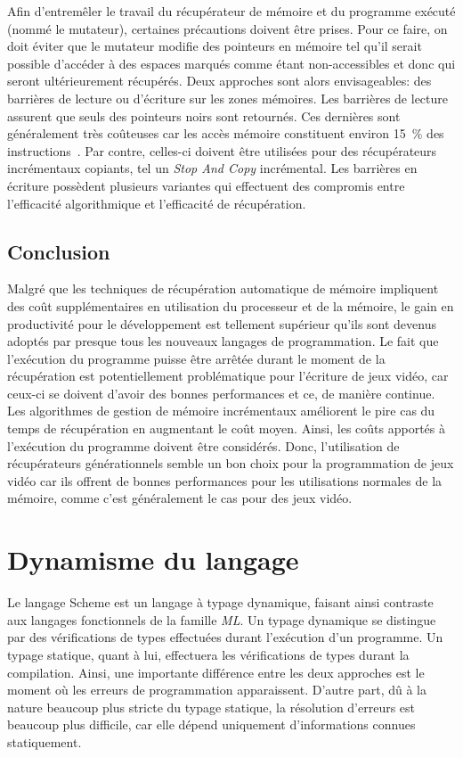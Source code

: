 \documentclass[12pt,twoside,letterpaper,francais]{book}
\begin{document}
Afin d'entremêler le travail du récupérateur de mémoire et du
programme exécuté (nommé le mutateur), certaines précautions doivent
être prises. Pour ce faire, on doit éviter que le mutateur modifie des
pointeurs en mémoire tel qu'il serait possible d'accéder à des espaces
marqués comme étant non-accessibles et donc qui seront ultérieurement
récupérés. Deux approches sont alors envisageables: des barrières de
lecture ou d'écriture sur les zones mémoires. Les barrières de lecture
assurent que seuls des pointeurs noirs sont retournés. Ces dernières
sont généralement très coûteuses car les accès mémoire constituent
environ 15~\% des instructions~\cite{Zorn90barriermethods}. Par
contre, celles-ci doivent être utilisées pour des récupérateurs
incrémentaux copiants, tel un \textit{Stop And Copy} incrémental. Les
barrières en écriture possèdent plusieurs variantes qui effectuent
des compromis entre l'efficacité algorithmique et l'efficacité de
récupération.


\FloatBarrier
\subsection{Conclusion}
Malgré que les techniques de récupération automatique de mémoire
impliquent des coût supplémentaires en utilisation du processeur et de
la mémoire, le gain en productivité pour le dévelop\-pement est
tellement supérieur qu'ils sont devenus adoptés par presque tous les
nouveaux langages de programmation. Le fait que l'exécution du
programme puisse être arrêtée durant le moment de la récupération est
potentiellement problématique pour l'écriture de jeux vidéo, car
ceux-ci se doivent d'avoir des bonnes performances et ce, de manière
continue. Les algorithmes de gestion de mémoire incrémentaux
améliorent le pire cas du temps de récupération en augmentant le coût
moyen. Ainsi, les coûts apportés à l'exécution du programme doivent
être considérés. Donc, l'utilisation de récupérateurs
gé\-né\-ra\-tion\-nels semble un bon choix pour la programmation de
jeux vidéo car ils offrent de bonnes performances pour les
utilisations normales de la mémoire, comme c'est généralement le cas
pour des jeux vidéo.


\FloatBarrier
\section{Dynamisme du langage}

Le langage Scheme est un langage à typage dynamique, faisant ainsi
contraste aux langages fonctionnels de la famille \textit{ML}. Un
typage dynamique se distingue par des vérifi\-cations de types
effectuées durant l'ex\-écution d'un programme. Un typage statique,
quant à lui, effectuera les vérifications de types durant la
compilation. Ainsi, une importante différence entre les deux approches
est le moment où les erreurs de programmation apparaissent. D'autre
part, dû à la nature beaucoup plus stricte du typage statique, la
résolution d'erreurs est beaucoup plus difficile, car elle dépend
uniquement d'informations connues statiquement.
\end{document}
